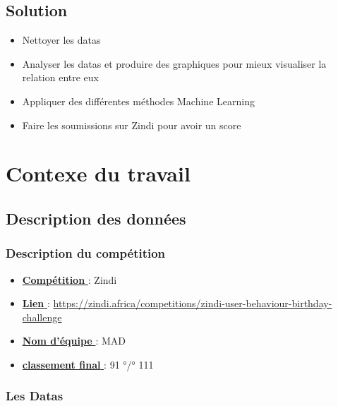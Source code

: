 \documentclass{report}
\begin{document}
\section{Solution}
\begin{itemize}[label=\textbullet , font=\Large]
	\item Nettoyer les datas 
	\item Analyser les datas et produire des graphiques pour mieux visualiser la relation entre eux 
	\item Appliquer des différentes méthodes Machine Learning 
	\item Faire les soumissions sur Zindi pour avoir un score
\end{itemize}




\hypertarget{projet_integré_zindi}{ %
\chapter{Contexe du travail}\label{Contexe du travail}}
\section{Description des données}
\subsection{Description du compétition}
\begin{itemize}[label=\textbullet, font=\large]
	\item \underline{\textbf{Compétition }} : Zindi 
	\item \underline{\textbf{Lien }} : \url{https://zindi.africa/competitions/zindi-user-behaviour-birthday-challenge}
	\item \underline{\textbf{Nom d'équipe }} : MAD
	\item \underline{\textbf{classement final }} : 91 °/° 111
\end{itemize}

\subsection{Les Datas}
\end{document}

